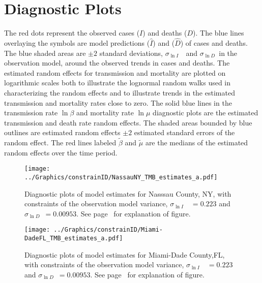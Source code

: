 \documentclass[12pt,letterpaper]{article}
\newcommand\slI{$\sigma_{\ln I}$\ }
\newcommand\slD{$\sigma_{\ln D}$}
\begin{document}
{\begin{appendices}
\begin{sidewaystable}
{%
}\end{sidewaystable}
\clearpage


\clearpage

\section{Diagnostic Plots}

\label{pp:diagexpl} 
The red dots represent the observed cases ($I$) and deaths ($D$).
The blue lines overlaying the symbols are model predictions ($\widehat{I}$)
and ($\widehat{D}$) of cases and deaths. 
The blue shaded areas are 
$\pm 2$ standard deviations, \slI\ and \slD\ in the
observation model, around the observed trends in cases and deaths.
The estimated random effects for transmission and mortality are plotted
on logarithmic scales both to illustrate the
lognormal random walks used in characterizing the random effects
and to illustrate trends in the estimated transmission and mortality
rates close to zero.
The solid blue lines in the transmission rate $\ln \beta$ and
mortality rate $\ln \mu$ diagnostic plots are the estimated
transmission and death rate random effects.
The shaded areas bounded by blue outlines are
estimated random effects $\pm 2$ estimated standard errors of the
random effect.
The red lines labeled $\tilde{\beta}$ and $\tilde{\mu}$ are the
medians of the estimated random effects over the time period.


\begin{figure}
\begin{center}
\texttt{[image: ../Graphics/constrainID/NassauNY\_TMB\_estimates\_a.pdf]}
\end{center}
\caption{\label{fig:estsNaNYc}
Diagnostic plots of model estimates for Nasssau County, NY, 
with constraints of the observation model variance, 
\slI~$ = 0.223$ and \slD~$= 0.00953$. 
See page~\pageref{pp:diagexpl} for explanation of figure.
}
\end{figure}

\begin{figure}
\begin{center}
\texttt{[image: ../Graphics/constrainID/Miami-DadeFL\_TMB\_estimates\_a.pdf]}
\end{center}
\caption{\label{fig:estsMDFLc}
Diagnostic plots of model estimates for Miami-Dade County,FL,
with constraints of the observation model variance, 
\slI~$ = 0.223$ and \slD~$= 0.00953$. 
See page~\pageref{pp:diagexpl} for explanation of figure.
}
\end{figure}


\end{appendices}}
\end{document}
